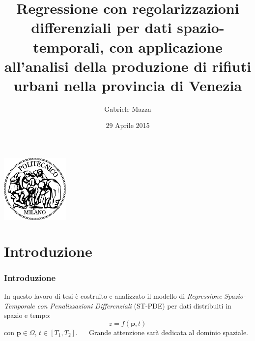 \documentclass[landscape,9pt]{beamer}                           %
\date{29 Aprile 2015}
\author{Gabriele Mazza}
\title{Regressione con regolarizzazioni differenziali per dati spazio-temporali, con applicazione all'analisi della produzione di rifiuti urbani nella provincia di Venezia}
\begin{document}
\begin{frame}
\maketitle
\begin{center}
\includegraphics[width=0.25\textwidth,
	height=0.28\textheight]
	{Immagini/Logo.png}
\end{center}
\end{frame}

\section{Introduzione}
\begin{frame}
\frametitle{Introduzione}
In questo lavoro di tesi è costruito e analizzato il modello di \textit{Regressione Spazio-Temporale con Penalizzazioni Differenziali} (ST-PDE) per dati distribuiti in spazio e tempo:
$$
z=f(\bm{p},t)
$$
con $\bm{p} \in \Omega$, $t \in [T_1,T_2]$.
\ \ 
\newline
\newline
Grande attenzione sarà dedicata al dominio spaziale.
\end{frame}
\end{document}
